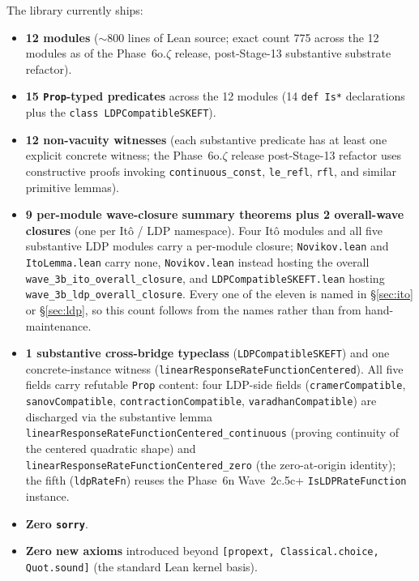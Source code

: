\documentclass[11pt]{article}
\begin{document}
The library currently ships:

\begin{itemize}
\item \textbf{12 modules} ($\sim$800 lines of Lean source;
  exact count 775 across the 12 modules as of the Phase~6o.$\zeta$
  release, post-Stage-13 substantive substrate refactor).
\item \textbf{15 \texttt{Prop}-typed predicates} across the 12 modules
  (14 \texttt{def Is*} declarations plus the
  \texttt{class LDPCompatibleSKEFT}).
\item \textbf{12 non-vacuity witnesses} (each substantive predicate
  has at least one explicit concrete witness; the Phase~6o.$\zeta$
  release post-Stage-13 refactor uses constructive proofs invoking
  \texttt{continuous\_const}, \texttt{le\_refl}, \texttt{rfl}, and
  similar primitive lemmas).
\item \textbf{9 per-module wave-closure summary theorems plus 2
  overall-wave closures} (one per It\^o / LDP namespace). Four It\^o
  modules and all five substantive LDP modules carry a per-module
  closure; \texttt{Novikov.lean} and \texttt{ItoLemma.lean} carry none,
  \texttt{Novikov.lean} instead hosting the overall
  \texttt{wave\_3b\_ito\_overall\_closure}, and
  \texttt{LDPCompatibleSKEFT.lean} hosting
  \texttt{wave\_3b\_ldp\_overall\_closure}. Every one of the eleven is
  named in \S\ref{sec:ito} or \S\ref{sec:ldp}, so this count follows
  from the names rather than from hand-maintenance.
\item \textbf{1 substantive cross-bridge typeclass}
  (\texttt{LDPCompatibleSKEFT}) and one concrete-instance witness
  (\texttt{linearResponseRateFunctionCentered}). All five fields
  carry refutable \texttt{Prop} content: four LDP-side fields
  (\texttt{cramerCompatible}, \texttt{sanovCompatible},
  \texttt{contractionCompatible}, \texttt{varadhanCompatible}) are
  discharged via the substantive lemma
  \texttt{linearResponseRateFunctionCentered\_continuous} (proving
  continuity of the centered quadratic shape) and
  \texttt{linearResponseRateFunctionCentered\_zero} (the
  zero-at-origin identity); the fifth (\texttt{ldpRateFn}) reuses
  the Phase~6n Wave~2c.5c+ \texttt{IsLDPRateFunction} instance.
\item \textbf{Zero \texttt{sorry}}.
\item \textbf{Zero new axioms} introduced beyond
  \texttt{[propext, Classical.choice, Quot.sound]} (the standard
  Lean kernel basis).
\end{itemize}
\end{document}
